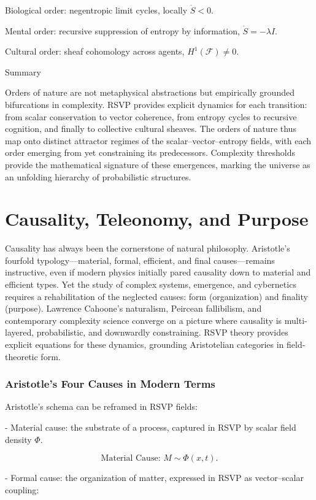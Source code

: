 \documentclass[12pt]{book}
\begin{document}
Biological order: negentropic limit cycles, locally \( \dot{S} < 0 \).

Mental order: recursive suppression of entropy by information, \( \dot{S} = - \lambda I \).

Cultural order: sheaf cohomology across agents, \( H^1(\mathcal{F}) \neq 0 \).

Summary

Orders of nature are not metaphysical abstractions but empirically grounded bifurcations in complexity. RSVP provides explicit dynamics for each transition: from scalar conservation to vector coherence, from entropy cycles to recursive cognition, and finally to collective cultural sheaves. The orders of nature thus map onto distinct attractor regimes of the scalar–vector–entropy fields, with each order emerging from yet constraining its predecessors. Complexity thresholds provide the mathematical signature of these emergences, marking the universe as an unfolding hierarchy of probabilistic structures.

\chapter{Causality, Teleonomy, and Purpose}
Causality has always been the cornerstone of natural philosophy. Aristotle’s fourfold typology—material, formal, efficient, and final causes—remains instructive, even if modern physics initially pared causality down to material and efficient types. Yet the study of complex systems, emergence, and cybernetics requires a rehabilitation of the neglected causes: form (organization) and finality (purpose). Lawrence Cahoone’s naturalism, Peircean fallibilism, and contemporary complexity science converge on a picture where causality is multi-layered, probabilistic, and downwardly constraining. RSVP theory provides explicit equations for these dynamics, grounding Aristotelian categories in field-theoretic form.

\subsection{Aristotle’s Four Causes in Modern Terms}
Aristotle’s schema can be reframed in RSVP fields:

- Material cause: the substrate of a process, captured in RSVP by scalar field density \( \Phi \).

  \[ \text{Material Cause: } M \sim \Phi(x,t). \]

- Formal cause: the organization of matter, expressed in RSVP as vector–scalar coupling:
\end{document}
